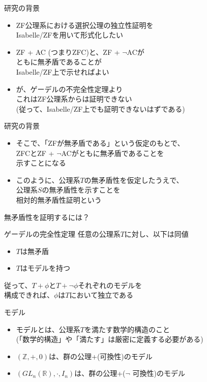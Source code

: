 \documentclass[17pt,aspectratio=169,xcolor=dvipsnames,table,dvipdfmx]{beamer}
\theoremstyle{definition}
\begin{document}
\begin{frame} {研究の背景}
    \begin{itemize}
        \item ZF公理系における選択公理の独立性証明を\\Isabelle/ZFを用いて形式化したい
        \item ZF + AC (つまりZFC)と、ZF + $\neg$ACが\\ ともに無矛盾であることが\\Isabelle/ZF上で示せればよい
        \item が、ゲーデルの不完全性定理より\\これはZF公理系からは証明できない\\{\small (従って、Isabelle/ZF上でも証明できないはずである)}
    \end{itemize}
\end{frame}

\begin{frame} {研究の背景}
    \begin{itemize}
        \item そこで、「ZFが無矛盾である」という仮定のもとで、\\ZFCとZF + $\neg$ACがともに無矛盾であることを\\示すことになる
        \item このように、公理系$T$の無矛盾性を仮定したうえで、\\公理系$S$の無矛盾性を示すことを\\相対的無矛盾性証明という
    \end{itemize}
\end{frame}

\begin{frame} {無矛盾性を証明するには？}
    \begin{exampleblock}{ゲーデルの完全性定理}
        任意の公理系$T$に対し、以下は同値
        \begin{itemize}
            \item $T$は無矛盾
            \item $T$はモデルを持つ
        \end{itemize}
    \end{exampleblock}
    従って、$T + \phi$と$T + \neg \phi$それぞれのモデルを\\構成できれば、$\phi$は$T$において独立である
\end{frame}

\begin{frame} {モデル}
    \begin{itemize}
        \item モデルとは、公理系$T$を満たす数学的構造のこと \\ {\footnotesize (「数学的構造」や「満たす」は厳密に定義する必要がある)}
        \item $(\mathbb{Z}, +, 0)$は、群の公理+(可換性)のモデル
        \item $(GL_n(\mathbb{R}), \cdot, I_n)$は、群の公理+($\neg$ 可換性)のモデル
    \end{itemize}
\end{frame}
\end{document}
